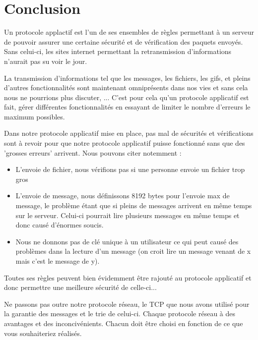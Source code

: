 \chapter{Conclusion}

Un protocole applactif est l'un de ses ensembles de règles permettant à un serveur de pouvoir assurer une certaine sécurité et de vérification des paquets envoyés. Sans celui-ci, les sites internet permettant la retransmission d'informations n'aurait pas su voir le jour. \\ \par

La transmission d'informations tel que les messages, les fichiers, les gifs, et pleins d'autres fonctionnalités sont maintenant omniprésents dans nos vies et sans cela nous ne pourrions plus discuter, ... C'est pour cela qu'un protocole applicatif est fait, gérer différentes fonctionnalités en essayant de limiter le nombre d'erreurs le maximum possibles.

Dans notre protocole applicatif mise en place, pas mal de sécurités et vérifications sont à revoir pour que notre protocole applicatif puisse fonctionné sans que des 'grosses erreurs' arrivent. Nous pouvons citer notemment :
\begin{itemize}
    \item L'envoie de fichier, nous vérifions pas si une personne envoie un fichier trop gros
    \item L'envoie de message, nous définissons 8192 bytes pour l'envoie max de message, le problème étant que si pleins de messages arrivent en même temps sur le serveur. Celui-ci pourrait lire plusieurs messages en même temps et donc causé d'énormes soucis.
    \item Nous ne donnons pas de clé unique à un utilisateur ce qui peut causé des problèmes dans la lecture d'un message (on croit lire un message venant de x mais c'est le message de y).
\end{itemize}

Toutes ses règles peuvent bien évidemment être rajouté au protocole applicatif et donc permettre une meilleure sécurité de celle-ci...

Ne passons pas outre notre protocole réseau, le TCP que nous avons utilisé pour la garantie des messages et le trie de celui-ci. Chaque protocole réseau à des avantages et des inconcivénients. Chacun doit être choisi en fonction de ce que vous souhaiteriez réalisés.